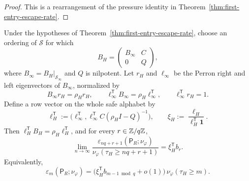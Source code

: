 \begin{proof}
This is a rearrangement of the pressure identity in
Theorem~\ref{thm:first-entry-escape-rate}.
\end{proof}

\begin{theorem}
\label{thm:quasistationary-ambiguity}
Under the hypotheses of Theorem~\ref{thm:first-entry-escape-rate},
choose an ordering of \(\mathcal S\) for which
\[
  B_H=
  \begin{pmatrix}
    B_\infty & C\\
    0 & Q
  \end{pmatrix},
\]
where \(B_\infty=B_H|_{\mathcal S_\infty}\) and \(Q\) is nilpotent.  Let
\(r_H\) and \(\ell_\infty\) be the Perron right and left eigenvectors of
\(B_\infty\), normalized by
\[
  B_\infty r_H=\rho_H r_H,
  \qquad
  \ell_\infty^{\mathsf T}B_\infty=\rho_H\ell_\infty^{\mathsf T},
  \qquad
  \ell_\infty^{\mathsf T}r_H=1.
\]
Define a row vector on the whole safe alphabet by
\[
  \ell_H^{\mathsf T}
  :=
  \bigl(
    \ell_\infty^{\mathsf T},
    \ell_\infty^{\mathsf T}C(\rho_H I-Q)^{-1}
  \bigr),
  \qquad
  \xi_H:=\frac{\ell_H}{\ell_H^{\mathsf T}\mathbf 1}.
\]
Then \(\ell_H^{\mathsf T}B_H=\rho_H\ell_H^{\mathsf T}\), and for every
\(r\in\mathbb{Z}/q\mathbb{Z}\),
\[
  \lim_{n\to\infty}
  \frac{
    \varepsilon_{nq+r+1}(\mathsf P_R;\nu_\varphi)
  }{
    \nu_\varphi(\tau_H\ge nq+r+1)
  }
  = \xi_H^{\mathsf T}b_r.
\]
Equivalently,
\[
  \varepsilon_m(\mathsf P_R;\nu_\varphi)
  = \bigl(\xi_H^{\mathsf T}b_{m-1\bmod q}+o(1)\bigr)\,
    \nu_\varphi(\tau_H\ge m).
\]
\end{theorem}

